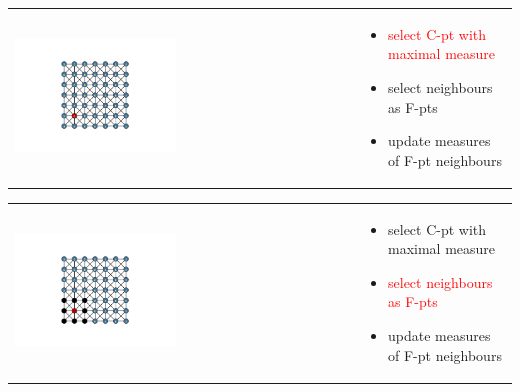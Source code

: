 \documentclass{beamer}
\newcommand{\re}[1]{{\textcolor{red}       {#1}}}
\begin{document}
\begin{frame}


\begin{tabular}{ p{} p{}}

\hspace{5mm} \includegraphics[trim = 85mm 40mm 85mm  40mm, clip, width=0.48\textwidth]{../figures/AMG2.png} &

\vspace{-1.75in}

\begin{itemize}
  \item \re{select C-pt with maximal measure}
  \item select neighbours as F-pts
  \item update measures of F-pt neighbours

\end{itemize}
\end{tabular}

\end{frame}

\begin{frame}


\begin{tabular}{ p{} p{}}

\hspace{5mm} \includegraphics[trim = 85mm 40mm 85mm  40mm, clip, width=0.48\textwidth]{../figures/AMG3.png} &

\vspace{-1.75in}

\begin{itemize}
  \item select C-pt with maximal measure
  \item \re{select neighbours as F-pts}
  \item update measures of F-pt neighbours

\end{itemize}
\end{tabular}


\end{frame}
\end{document}
